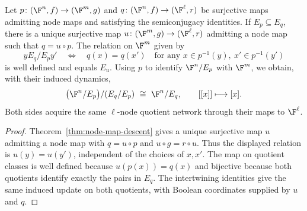 \newpage
\begin{theorem}\label{thm:nested-node-quotients}
Let $p\colon(\F^n,f)\to(\F^m,g)$ and $q\colon(\F^n,f)\to(\F^\ell,r)$ be surjective maps admitting node maps and satisfying the semiconjugacy identities. If $E_p\subseteq E_q$, there is a unique surjective map $u\colon(\F^m,g)\to(\F^\ell,r)$ admitting a node map such that $q=u\circ p$. The relation on $\F^m$ given by
\[
    y\mathrel{E_q/E_p}y'
    \quad\Longleftrightarrow\quad
    q(x)=q(x')\quad\text{for any }x\in p^{-1}(y),\ x'\in p^{-1}(y')
\]
is well defined and equals $E_u$. Using $p$ to identify $\F^n/E_p$ with $\F^m$, we obtain, with their induced dynamics,
\[
    \bigl(\F^n/E_p\bigr)/(E_q/E_p)\ \cong\ \F^n/E_q,
    \qquad [[x]]\longmapsto[x].
\]
Both sides acquire the same $\ell$-node quotient network through their maps to $\F^\ell$.
\end{theorem}

\begin{proof}
Theorem~\ref{thm:node-map-descent} gives a unique surjective map $u$ admitting a node map with $q=u\circ p$ and $u\circ g=r\circ u$. Thus the displayed relation is $u(y)=u(y')$, independent of the choices of $x,x'$. The map on quotient classes is well defined because $u(p(x))=q(x)$ and bijective because both quotients identify exactly the pairs in $E_q$. The intertwining identities give the same induced update on both quotients, with Boolean coordinates supplied by $u$ and $q$.
\end{proof}

